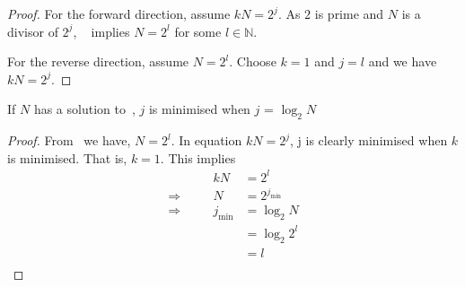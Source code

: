 \documentclass{article}
\begin{document}
\begin{proof}
For the forward direction, assume $kN=2^j$. As $2$ is prime and $N$ is a divisor of $2^j$, ~ implies $N=2^l$ for some $l \in \mathbb{N}$.

For the reverse direction, assume $N=2^l$. Choose $k=1$ and $j=l$ and we have $kN=2^j$.
\end{proof}

\begin{corollary}
If $N$ has a solution to~, $j$ is minimised when $j$ = $\log_2 N$
\end{corollary}

\begin{proof}
From~ we have, $N=2^l$. In equation $kN=2^j$, j is clearly minimised when $k$ is minimised. That is, $k=1$. This implies
\begin{equation}
\begin{alignedat}{2}
&& kN &= 2^l \\
\Rightarrow\quad && N &= 2^{j_\text{min}} \\
\Rightarrow\quad && j_\text{min} &= \log_2 N \\
&& &= \log_2 2^l \\
&& &= l \\
\end{alignedat}
\end{equation}
\end{proof}
\end{document}
